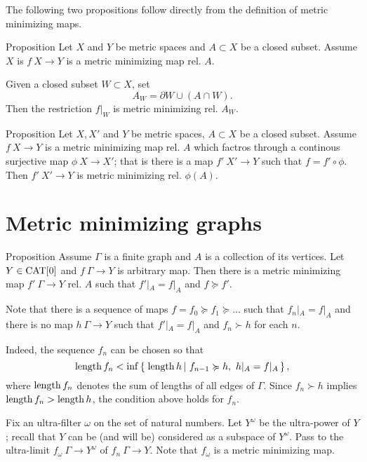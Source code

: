 \documentclass[a4paper,10pt]{amsart}
\begin{document}
The following two propositions follow directly from the definition of metric minimizing maps.

\begin{thm}{Proposition}\label{prop:subset}
Let $X$ and $Y$ be metric spaces and $A\subset X$ be a closed subset.
Assume $X$ is $f\:X\to Y$ is a metric minimizing map rel. $A$.

Given a closed subset $W\subset X$, set 
\[A_W=\partial W\cup (A\cap W).\]
Then the restriction $f|_W$ is metric minimizing rel. $A_W$.
\end{thm}

\begin{thm}{Proposition}\label{prop:factor}
Let $X, X'$ and $Y$ be metric spaces, 
$A\subset X$ be a closed subset.
Assume $f\:X\to Y$ is a metric minimizing map rel. $A$
which factros through a continous surjective map $\phi\:X\to X'$;
that is there is a map $f'\:X'\to Y$ such that $f=f'\circ\phi$.
Then $f'\:X'\to Y$ is metric minimizing rel. $\phi(A)$.
\end{thm}

\section{Metric minimizing graphs}



\begin{thm}{Proposition}
Assume $\Gamma$ is a  finite graph and $A$ is a collection of its vertices.
Let $Y\in\mathop{\rm CAT}\nolimits[0]$ and $f\:\Gamma\to Y$ is arbitrary map.
Then there is a metric minimizing map $f'\:\Gamma\to Y$ rel. $A$ such that
$f'|_A=f|_A$ and 
$f\succcurlyeq f'$.
\end{thm} 

 Note that there is a sequence of maps $f=f_0\succcurlyeq f_1\succcurlyeq\dots$ such that $f_n|_A=f|_A$ and there is no map $h\:\Gamma\to Y$ such that $f'|_A=f|_A$ and $f_n\succ h$ for each $n$.

Indeed, the sequence $f_n$ can be chosen so that
\[\length f_n<\inf\set{\length h}{f_{n-1}\succcurlyeq h,\ h|_A=f|_A},\]
where $\mathop{\rm length}\nolimits f_n$ denotes the sum of lengths of all edges of $\Gamma$. %
Since $f_n\succ h$ implies $\mathop{\rm length}\nolimits f_n>\mathop{\rm length}\nolimits h$, 
the condition above holds for $f_n$.

Fix an ultra-filter $\omega$ on the set of natural numbers.
Let $Y^\omega$ be the ultra-power of $Y$;
recall that $Y$ can be (and will be) considered as a subspace of $Y^\omega$.
Pass to the ultra-limit $f_\omega\:\Gamma\to Y^\omega$ 
of $f_n\:\Gamma\to Y$.
Note that $f_\omega$ is a metric minimizing map.
\end{document}
